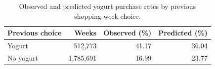 \begin{table}[htbp]
\centering\small
\caption{Observed and predicted yogurt purchase rates by previous shopping-week choice.}
\label{tab:weekly-fit}
\begin{tabular}{lrrr}
\toprule
Previous choice & Weeks & Observed (\%) & Predicted (\%) \\
\midrule
Yogurt & 512,773 & 41.17 & 36.04 \\
No yogurt & 1,785,691 & 16.99 & 23.77 \\
\bottomrule
\end{tabular}
\end{table}
